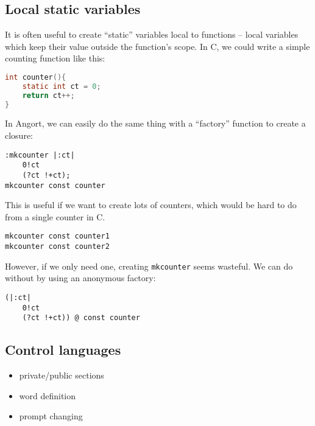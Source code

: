 

\subsection{Local static variables}
It is often useful to create ``static'' variables local to functions --
local variables which keep their value outside the function's scope.
In C, we could write a simple counting function like this:
\begin{lstlisting}[language=c]
int counter(){
    static int ct = 0;
    return ct++;
}
\end{lstlisting}
In Angort, we can easily do the same thing with a ``factory'' function
to create a closure:
\begin{lstlisting}
:mkcounter |:ct|
    0!ct
    (?ct !+ct);  
mkcounter const counter
\end{lstlisting}
This is useful if we want to create lots of counters, which would be 
hard to do from a single counter in C.
\begin{lstlisting}
mkcounter const counter1
mkcounter const counter2
\end{lstlisting}
However, if we only need one, creating \texttt{mkcounter} seems wasteful.
We can do without by using an anonymous factory:
\begin{lstlisting}
(|:ct|
    0!ct
    (?ct !+ct)) @ const counter
\end{lstlisting}




\subsection{Control languages}
{\color{red}
\begin{itemize}
\item private/public sections
\item word definition
\item prompt changing
\end{itemize}
}

